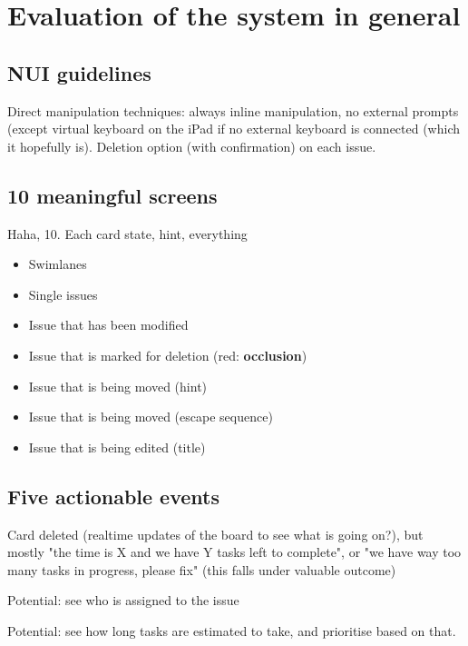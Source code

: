 \section{Evaluation of the system in general}

\subsection{NUI guidelines}

Direct manipulation techniques: always inline manipulation, no external prompts (except virtual keyboard on the iPad if no external keyboard is connected (which it hopefully is). Deletion option (with confirmation) on each issue.

\subsection{10 meaningful screens}

Haha, 10. Each card state, hint, everything


\begin{itemize}
  \item Swimlanes
  \item Single issues
  \item Issue that has been modified
  \item Issue that is marked for deletion (red: \textbf{occlusion}) 
  \item Issue that is being moved (hint)
  \item Issue that is being moved (escape sequence)
  \item Issue that is being edited (title)
\end{itemize}

\subsection{Five actionable events}

Card deleted (realtime updates of the board to see what is going on?), but mostly "the time is X and we have Y tasks left to complete", or "we have way too many tasks in progress, please fix" (this falls under valuable outcome)

Potential: see who is assigned to the issue

Potential: see how long tasks are estimated to take, and prioritise based on that.

